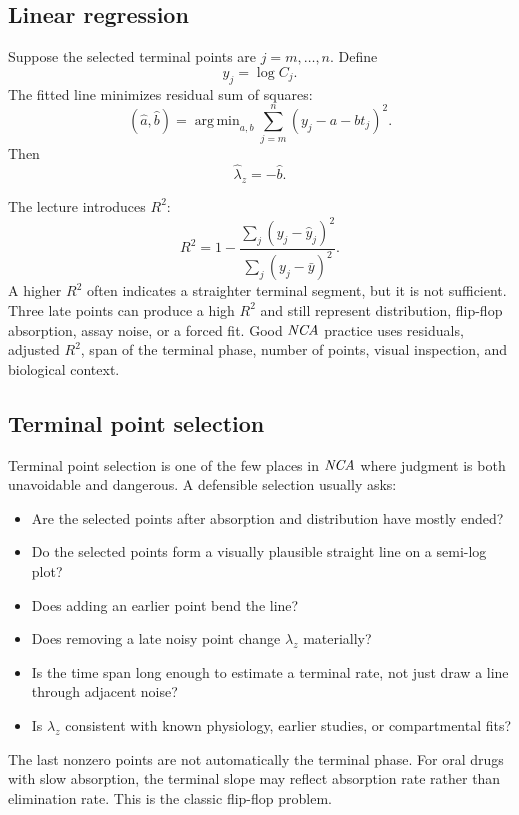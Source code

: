 \documentclass[a4paper]{article}
\DeclareMathOperator*{\argmin}{arg\,min}
\newcommand{\lambdaZ}{\ensuremath{\lambda_z}}
\newcommand{\NCA}{\ensuremath{\pksym{NCA}}}
\begin{document}
\subsection{Linear regression}

Suppose the selected terminal points are \(j=m,\ldots,n\). Define
\[
  y_j=\log C_j.
\]
The fitted line minimizes residual sum of squares:
\[
  (\hat a,\hat b)
  =
  \argmin_{a,b}
  \sum_{j=m}^{n}(y_j-a-bt_j)^2.
\]
Then
\[
  \hat\lambda_z=-\hat b.
\]

The lecture introduces \(R^2\):
\[
  R^2
  =
  1-\frac{\sum_j(y_j-\hat y_j)^2}{\sum_j(y_j-\bar y)^2}.
\]
A higher \(R^2\) often indicates a straighter terminal segment, but it is not sufficient. Three late points can produce a high \(R^2\) and still represent distribution, flip-flop absorption, assay noise, or a forced fit. Good \NCA{} practice uses residuals, adjusted \(R^2\), span of the terminal phase, number of points, visual inspection, and biological context.

\subsection{Terminal point selection}

Terminal point selection is one of the few places in \NCA{} where judgment is both unavoidable and dangerous. A defensible selection usually asks:
\begin{itemize}[leftmargin=2em]
  \item Are the selected points after absorption and distribution have mostly ended?
  \item Do the selected points form a visually plausible straight line on a semi-log plot?
  \item Does adding an earlier point bend the line?
  \item Does removing a late noisy point change \(\lambdaZ\) materially?
  \item Is the time span long enough to estimate a terminal rate, not just draw a line through adjacent noise?
  \item Is \(\lambdaZ\) consistent with known physiology, earlier studies, or compartmental fits?
\end{itemize}

\begin{warning}
  The last nonzero points are not automatically the terminal phase. For oral drugs with slow absorption, the terminal slope may reflect absorption rate rather than elimination rate. This is the classic flip-flop problem.
\end{warning}
\end{document}
